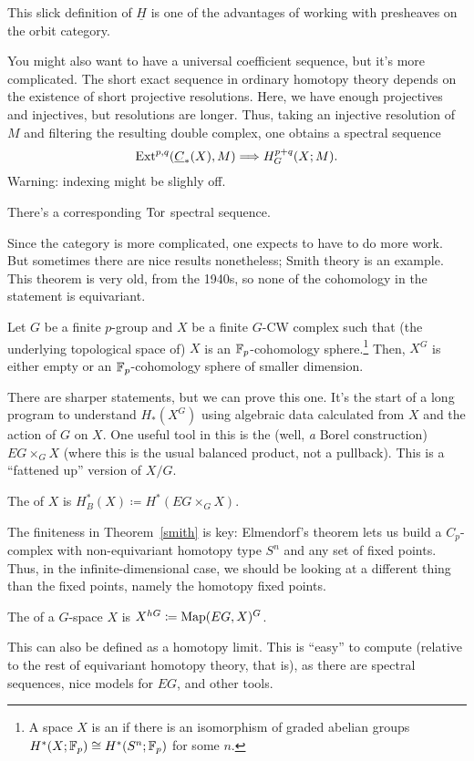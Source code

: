 This slick definition of $\underline H$ is one of the advantages of working with presheaves on the orbit category.
\begin{rem}
You might also want to have a universal coefficient sequence, but it's more complicated. The short exact sequence
in ordinary homotopy theory depends on the existence of short projective resolutions. Here, we have enough
projectives and injectives, but resolutions are longer. Thus, taking an injective resolution of $M$ and filtering
the resulting double complex, one obtains a spectral sequence
\[\operatorname{Ext}^{p,q}(\underline C_*(X), M)\Longrightarrow H_G^{p+q}(X;M).\]
{\color{red}Warning}: indexing might be slighly off.

There's a corresponding $\operatorname{Tor}$ spectral sequence.
\end{rem}
Since the category is more complicated, one expects to have to do more work. But sometimes there are nice results
nonetheless; Smith theory is an example. This theorem is very old, from the 1940s, so none of the cohomology in the
statement is equivariant.
\begin{thm}[Smith]
\label{smith}
Let $G$ be a finite $p$-group and $X$ be a finite $G$-CW complex such that (the underlying topological space of)
$X$ is an $\mathbb F_p$-cohomology sphere.\footnote{A space $X$ is an  if there is an
isomorphism of graded abelian groups $H^*(X;\mathbb F_p)\cong H^*(S^n;\mathbb F_p)$ for some $n$.} Then, $X^G$ is either empty or
an $\mathbb F_p$-cohomology sphere of smaller dimension.
\end{thm}
There are sharper statements, but we can prove this one. It's the start of a long program to understand $H_*(X^G)$
using algebraic data calculated from $X$ and the action of $G$ on $X$. One useful tool in this is the  (well, \emph a Borel construction) $EG\times_G X$ (where this is the usual balanced product, not a
pullback). This is a ``fattened up'' version of $X/G$.
\begin{defn}
The  of $X$ is $H_B^*(X) \coloneqq H^*(EG\times_G X)$.
\end{defn}

The finiteness in Theorem~\ref{smith} is key: Elmendorf's theorem lets us build a $C_p$-complex with
non-equivariant homotopy type $S^n$ and any set of fixed points. Thus, in the infinite-dimensional case, we should
be looking at a different thing than the fixed points, namely the homotopy fixed points.
\begin{defn}
The  of a $G$-space $X$ is $X^{hG}\coloneqq \operatorname{Map}(EG, X)^G$.
\end{defn}
This can also be defined as a homotopy limit. This is ``easy'' to compute (relative to the rest of equivariant
homotopy theory, that is), as there are spectral sequences, nice models for $EG$, and other tools.

